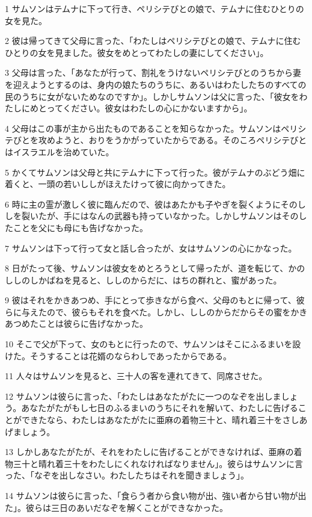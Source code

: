 \par 1 サムソンはテムナに下って行き、ペリシテびとの娘で、テムナに住むひとりの女を見た。
\par 2 彼は帰ってきて父母に言った、「わたしはペリシテびとの娘で、テムナに住むひとりの女を見ました。彼女をめとってわたしの妻にしてください」。
\par 3 父母は言った、「あなたが行って、割礼をうけないペリシテびとのうちから妻を迎えようとするのは、身内の娘たちのうちに、あるいはわたしたちのすべての民のうちに女がないためなのですか」。しかしサムソンは父に言った、「彼女をわたしにめとってください。彼女はわたしの心にかないますから」。
\par 4 父母はこの事が主から出たものであることを知らなかった。サムソンはペリシテびとを攻めようと、おりをうかがっていたからである。そのころペリシテびとはイスラエルを治めていた。
\par 5 かくてサムソンは父母と共にテムナに下って行った。彼がテムナのぶどう畑に着くと、一頭の若いししがほえたけって彼に向かってきた。
\par 6 時に主の霊が激しく彼に臨んだので、彼はあたかも子やぎを裂くようにそのししを裂いたが、手にはなんの武器も持っていなかった。しかしサムソンはそのしたことを父にも母にも告げなかった。
\par 7 サムソンは下って行って女と話し合ったが、女はサムソンの心にかなった。
\par 8 日がたって後、サムソンは彼女をめとろうとして帰ったが、道を転じて、かのししのしかばねを見ると、ししのからだに、はちの群れと、蜜があった。
\par 9 彼はそれをかきあつめ、手にとって歩きながら食べ、父母のもとに帰って、彼らに与えたので、彼らもそれを食べた。しかし、ししのからだからその蜜をかきあつめたことは彼らに告げなかった。
\par 10 そこで父が下って、女のもとに行ったので、サムソンはそこにふるまいを設けた。そうすることは花婿のならわしであったからである。
\par 11 人々はサムソンを見ると、三十人の客を連れてきて、同席させた。
\par 12 サムソンは彼らに言った、「わたしはあなたがたに一つのなぞを出しましょう。あなたがたがもし七日のふるまいのうちにそれを解いて、わたしに告げることができたなら、わたしはあなたがたに亜麻の着物三十と、晴れ着三十をさしあげましょう。
\par 13 しかしあなたがたが、それをわたしに告げることができなければ、亜麻の着物三十と晴れ着三十をわたしにくれなければなりません」。彼らはサムソンに言った、「なぞを出しなさい。わたしたちはそれを聞きましょう」。
\par 14 サムソンは彼らに言った、「食らう者から食い物が出、強い者から甘い物が出た」。彼らは三日のあいだなぞを解くことができなかった。
